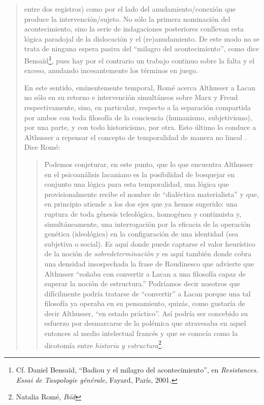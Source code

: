 \begin{quote}
entre dos registros) como por el lado del anudamiento/conexión que produce la intervención/sujeto. No sólo la primera nominación del acontecimiento, sino la serie de indagaciones posteriores conllevan esta lógica paradojal de la dislocación y el (re)anudamiento. De este modo no se trata de ninguna espera pasiva del \enquote{milagro del acontecimiento}, como dice Bensaïd\footnote{Cf. Daniel Bensaïd, \enquote{Badiou y el milagro del acontecimiento}, en \emph{Resistances. Essai de Taupologie générale,} Fayard, París, 2001.}, pues hay por el contrario un trabajo continuo sobre la falta y el exceso, anudando incesantemente los términos en juego.

En este sentido, eminentemente temporal, Romé acerca Althusser a Lacan no sólo en su retorno e intervención simultáneos sobre Marx y Freud respectivamente, sino, en particular, respecto a la separación compartida por ambos con toda filosofía de la conciencia (humanismo, subjetivismo), por una parte, y con todo historicismo, por otra. Esto último lo conduce a Althusser a repensar el concepto de temporalidad de manera no lineal . Dice Romé:

\begin{quote}
Podemos conjeturar, en este punto, que lo que encuentra Althusser en el psicoanálisis lacaniano es la posibilidad de bosquejar en conjunto una lógica para esta temporalidad, una lógica que provisionalmente recibe el nombre de \enquote{dialéctica materialista} y que, en principio atiende a los dos ejes que ya hemos sugerido: una ruptura de toda génesis teleológica, homogénea y continuista y, simultáneamente, una interrogación por la eficacia de la operación genética (ideológica) en la configuración de una identidad (sea subjetiva o social). Es aquí donde puede captarse el valor heurístico de la noción de \emph{sobredeterminación} y es aquí también donde cobra una densidad insospechada la frase de Roudinesco que advierte que Althusser \enquote{soñaba con convertir a Lacan a una filosofía capaz de superar la noción de estructura.} Podríamos decir nosotros que difícilmente podría tratarse de \enquote{convertir} a Lacan porque una tal filosofía ya operaba en su pensamiento, quizás, como gustaría de decir Althusser, \enquote{en estado práctico}. Así podría ser concebido su esfuerzo por desmarcarse de la polémica que atravesaba en aquel entonces al medio intelectual francés y que se conocía como la dicotomía entre \emph{historia y estructura}\footnote{Natalia Romé, \emph{Ibíd}}.
\end{quote}


\end{quote}
